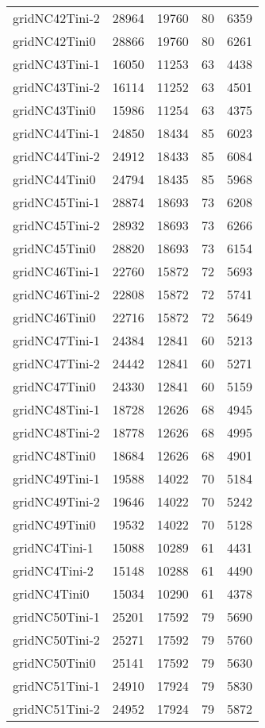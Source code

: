 \begin{longtable}{lrrrr}
gridNC42Tini-2 & 28964 & 19760 & 80 & 6359 \\
gridNC42Tini0 & 28866 & 19760 & 80 & 6261 \\
gridNC43Tini-1 & 16050 & 11253 & 63 & 4438 \\
gridNC43Tini-2 & 16114 & 11252 & 63 & 4501 \\
gridNC43Tini0 & 15986 & 11254 & 63 & 4375 \\
gridNC44Tini-1 & 24850 & 18434 & 85 & 6023 \\
gridNC44Tini-2 & 24912 & 18433 & 85 & 6084 \\
gridNC44Tini0 & 24794 & 18435 & 85 & 5968 \\
gridNC45Tini-1 & 28874 & 18693 & 73 & 6208 \\
gridNC45Tini-2 & 28932 & 18693 & 73 & 6266 \\
gridNC45Tini0 & 28820 & 18693 & 73 & 6154 \\
gridNC46Tini-1 & 22760 & 15872 & 72 & 5693 \\
gridNC46Tini-2 & 22808 & 15872 & 72 & 5741 \\
gridNC46Tini0 & 22716 & 15872 & 72 & 5649 \\
gridNC47Tini-1 & 24384 & 12841 & 60 & 5213 \\
gridNC47Tini-2 & 24442 & 12841 & 60 & 5271 \\
gridNC47Tini0 & 24330 & 12841 & 60 & 5159 \\
gridNC48Tini-1 & 18728 & 12626 & 68 & 4945 \\
gridNC48Tini-2 & 18778 & 12626 & 68 & 4995 \\
gridNC48Tini0 & 18684 & 12626 & 68 & 4901 \\
gridNC49Tini-1 & 19588 & 14022 & 70 & 5184 \\
gridNC49Tini-2 & 19646 & 14022 & 70 & 5242 \\
gridNC49Tini0 & 19532 & 14022 & 70 & 5128 \\
gridNC4Tini-1 & 15088 & 10289 & 61 & 4431 \\
gridNC4Tini-2 & 15148 & 10288 & 61 & 4490 \\
gridNC4Tini0 & 15034 & 10290 & 61 & 4378 \\
gridNC50Tini-1 & 25201 & 17592 & 79 & 5690 \\
gridNC50Tini-2 & 25271 & 17592 & 79 & 5760 \\
gridNC50Tini0 & 25141 & 17592 & 79 & 5630 \\
gridNC51Tini-1 & 24910 & 17924 & 79 & 5830 \\
gridNC51Tini-2 & 24952 & 17924 & 79 & 5872 \\

\end{longtable}
